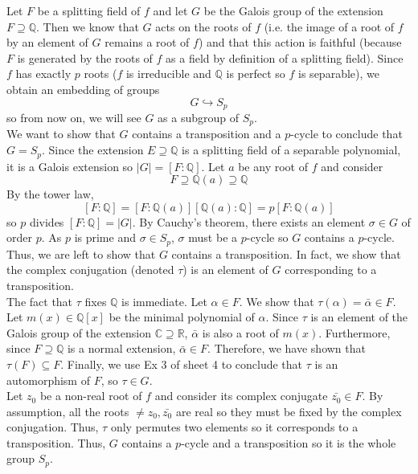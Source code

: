 \documentclass[12pt,a4paper]{article}
\begin{document}
Let $F$ be a splitting field of $f$ and let $G$ be the Galois group of the extension $F \supseteq \mathbb{Q}$. Then we know that $G$ acts on the roots of $f$ (i.e. the image of a root of $f$ by an element of $G$ remains a root of $f$) and that this action is faithful (because $F$ is generated by the roots of $f$ as a field by definition of a splitting field). Since $f$ has exactly $p$ roots ($f$ is irreducible and $\mathbb{Q}$ is perfect so $f$ is separable), we obtain an embedding of groups \[G \hookrightarrow  S_p\] so from now on, we will see $G$ as a subgroup of $S_p$. \\
We want to show that $G$ contains a transposition and a $p$-cycle to conclude that $G = S_p$. Since the extension $E \supseteq \mathbb{Q}$ is a splitting field of a separable polynomial, it is a Galois extension so $|G| = [F : \mathbb{Q}]$. Let $a$ be any root of $f$ and consider \[F \supseteq \mathbb{Q}(a) \supseteq \mathbb{Q}\] By the tower law, \[[F : \mathbb{Q}] = [F : \mathbb{Q}(a)][\mathbb{Q}(a) : \mathbb{Q}] = p[F : \mathbb{Q}(a)]\] so $p$ divides $[F : \mathbb{Q}] = |G|$. By Cauchy's theorem, there exists an element $\sigma \in G$ of order $p$. As $p$ is prime and $\sigma \in S_p$, $\sigma$ must be a $p$-cycle so $G$ contains a $p$-cycle. \\
Thus, we are left to show that $G$ contains a transposition. In fact, we show that the complex conjugation (denoted $\tau$) is an element of $G$ corresponding to a transposition. \\ The fact that $\tau$ fixes $\mathbb{Q}$ is immediate. Let $\alpha \in F$. We show that $\tau(\alpha) = \bar{\alpha} \in F$. Let $m(x) \in \mathbb{Q}[x]$ be the minimal polynomial of $\alpha$. Since $\tau$ is an element of the Galois group of the extension $\mathbb{C} \supseteq \mathbb{R}$, $\bar{\alpha}$ is also a root of $m(x)$. Furthermore, since $F \supseteq \mathbb{Q}$ is a normal extension, $\bar{\alpha} \in F$. Therefore, we have shown that $\tau(F) \subseteq F$. Finally, we use Ex 3 of sheet 4 to conclude that $\tau$ is an automorphism of $F$, so $\tau \in G$. \\
Let $z_0$ be a non-real root of $f$ and consider its complex conjugate $\bar{z_0} \in F$. By assumption, all the roots $\neq z_0, \bar{z_0}$ are real so they must be fixed by the complex conjugation. Thus, $\tau$ only permutes two elements so it corresponds to a transposition. Thus, $G$ contains a $p$-cycle and a transposition so it is the whole group $S_p$.
\end{document}
